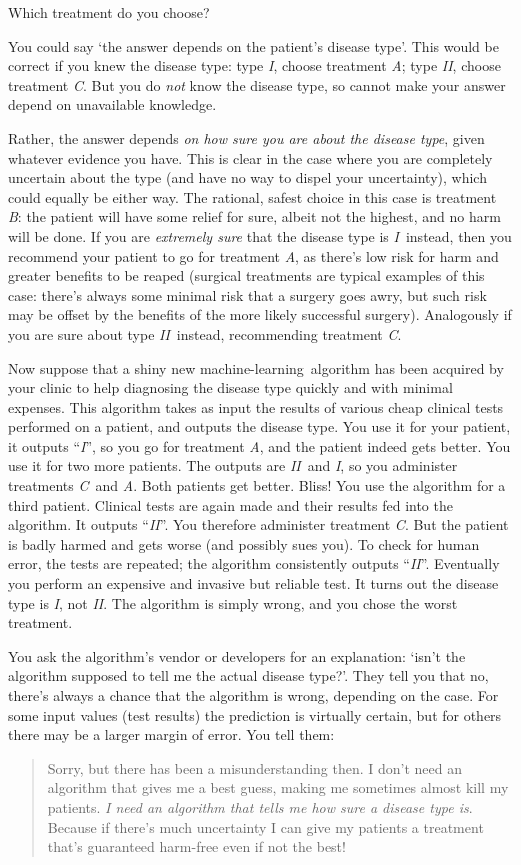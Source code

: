 \documentclass[\ifafour a4paper,12pt,\else a5paper,10pt,\fi%
onecolumn,oneside,article,%
british%
]{memoir}
\theoremstyle{remark}
\theoremstyle{innote}
\renewcommand*{\|}[1][]{\nonscript\:#1\vert\nonscript\:\mathopen{}}
\newcommand*{\ml}{machine-learning}
\newcommand*{\tI}{\textit{I}}
\newcommand*{\tII}{\textit{II}}
\newcommand*{\tA}{\textit{A}}
\newcommand*{\tB}{\textit{B}}
\newcommand*{\tC}{\textit{C}}
\begin{document}
Which treatment do you choose?

You could say \enquote*{the answer depends on the patient's disease type}. This would be correct if you knew the disease type: type \tI, choose treatment \tA; type \tII, choose treatment \tC. But you do \emph{not} know the disease type, so cannot make your answer depend on unavailable knowledge.

Rather, the answer depends \emph{on how sure you are about the disease type}, given whatever evidence you have. This is clear in the case where you are completely uncertain about the type (and have no way to dispel your uncertainty), which could equally be either way. The rational, safest choice in this case is treatment \tB: the patient will have some relief for sure, albeit not the highest, and no harm will be done. If you are \emph{extremely sure}  that the disease type is \tI\ instead, then you recommend your patient to go for treatment \tA, as there's low risk for harm  and greater benefits to be reaped (surgical treatments are typical examples of this case: there's always some minimal risk that a surgery goes awry, but such risk may be offset by the benefits of the more likely successful surgery). Analogously if you are sure about type \tII\ instead, recommending treatment \tC.

Now suppose that a shiny new \ml\ algorithm has been acquired by your clinic to help diagnosing the disease type quickly and with minimal expenses. This algorithm takes as input the results of various cheap clinical tests performed on a patient, and outputs the disease type. You use it for your patient, it outputs \enquote{\tI}, so you go for treatment \tA, and the patient indeed gets better. You use it for two more patients. The outputs are \tII\ and \tI, so you administer treatments \tC\ and \tA. Both patients get better. Bliss! You use the algorithm for a third patient. Clinical tests are again made and their results fed into the algorithm. It outputs \enquote{\tII}. You therefore administer treatment \tC. But the patient is badly harmed and gets worse (and possibly sues you). To check for human error, the tests are repeated; the algorithm consistently outputs \enquote{\tII}. Eventually you perform an expensive and invasive but reliable test. It turns out the disease type is \tI, not \tII. The algorithm is simply wrong, and you chose the worst treatment.

You ask the algorithm's vendor or developers for an explanation: \enquote*{isn't the algorithm supposed to tell me the actual disease type?}. They tell you that no, there's always a chance that the algorithm is wrong, depending on the case. For some input values (test results) the prediction is virtually certain, but for others there may be a larger margin of error. You tell them:
\begin{quote}
  Sorry, but there has been a misunderstanding then. I don't need an algorithm that gives me a best guess, making me sometimes almost kill my patients. \emph{I need an algorithm that tells me how sure a disease type is}. Because if there's much uncertainty I can give my patients a treatment that's guaranteed harm-free even if not the best!
\end{quote}
\end{document}
